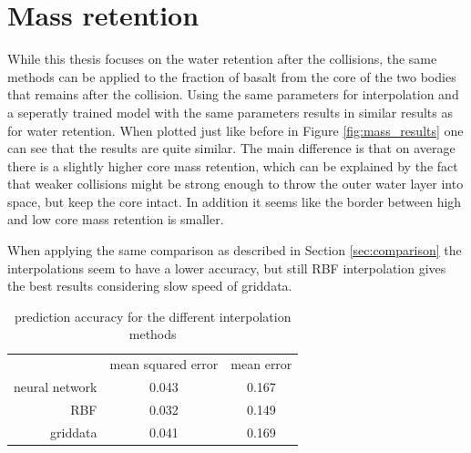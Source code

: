 \chapter{Mass retention}

While this thesis focuses on the water retention after the collisions, the same methods can be applied to the fraction of basalt from the core of the two bodies that remains after the collision. Using the same parameters for interpolation and a seperatly trained model with the same parameters results in similar results as for water retention. When plotted just like before in Figure \ref{fig:mass_results} one can see that the results are quite similar. The main difference is that on average there is a slightly higher core mass retention, which can be explained by the fact that weaker collisions might be strong enough to throw the outer water layer into space, but keep the core intact. In addition it seems like the border between high and low core mass retention is smaller.

When applying the same comparison as described in Section \ref{sec:comparison} the interpolations seem to have a lower accuracy, but still RBF interpolation gives the best results considering slow speed of griddata.


\begin{table}
	\centering
	\begin{tabular}{rcc}
		& {mean squared error} & {mean error} \\
		neural network &        0.043         &    0.167     \\
		RBF &        0.032         &    0.149     \\
		griddata &        0.041         &   0.169
	\end{tabular}
	\caption{prediction accuracy for the different interpolation methods}
	\label{tab:mass_comparison}
\end{table}

